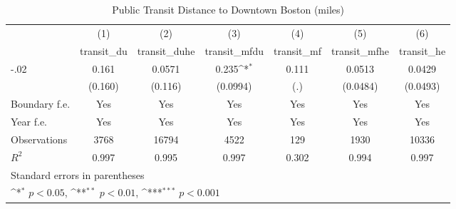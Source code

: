 \begin{table}[htbp]\centering
\def\sym#1{\ifmmode^{#1}\else\(^{#1}\)\fi}
\caption{Public Transit Distance to Downtown Boston (miles)}
\begin{tabular}{l*{6}{c}}
\hline\hline
                    &\multicolumn{1}{c}{(1)}&\multicolumn{1}{c}{(2)}&\multicolumn{1}{c}{(3)}&\multicolumn{1}{c}{(4)}&\multicolumn{1}{c}{(5)}&\multicolumn{1}{c}{(6)}\\
                    &\multicolumn{1}{c}{transit\_du}&\multicolumn{1}{c}{transit\_duhe}&\multicolumn{1}{c}{transit\_mfdu}&\multicolumn{1}{c}{transit\_mf}&\multicolumn{1}{c}{transit\_mfhe}&\multicolumn{1}{c}{transit\_he}\\
\hline
-.02                &       0.161         &      0.0571         &       0.235\sym{*}  &       0.111         &      0.0513         &      0.0429         \\
                    &     (0.160)         &     (0.116)         &    (0.0994)         &         (.)         &    (0.0484)         &    (0.0493)         \\
[1em]
Boundary f.e.       &         Yes         &         Yes         &         Yes         &         Yes         &         Yes         &         Yes         \\
[1em]
Year f.e.           &         Yes         &         Yes         &         Yes         &         Yes         &         Yes         &         Yes         \\
\hline
Observations        &        3768         &       16794         &        4522         &         129         &        1930         &       10336         \\
\(R^{2}\)           &       0.997         &       0.995         &       0.997         &       0.302         &       0.994         &       0.997         \\
\hline\hline
\multicolumn{7}{l}{\footnotesize Standard errors in parentheses}\\
\multicolumn{7}{l}{\footnotesize \sym{*} \(p<0.05\), \sym{**} \(p<0.01\), \sym{***} \(p<0.001\)}\\
\end{tabular}
\end{table}
